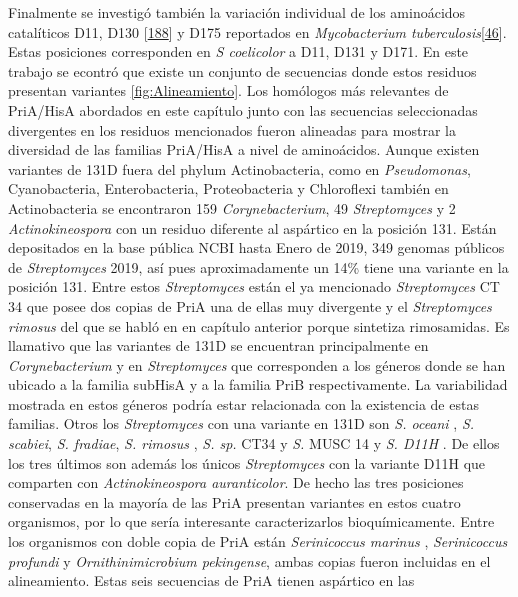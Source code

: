 \documentclass[12pt,twoside]{reedthesis}
\begin{document}
  Finalmente se investigó también la variación individual de los
  aminoácidos catalíticos D11, D130
  {[}\protect\hyperlink{ref-due_bisubstrate_2011}{188}{]} y D175
  reportados en \emph{Mycobacterium
  tuberculosis}{[}\protect\hyperlink{ref-verduzco-castro_co-occurrence_2016}{46}{]}.
  Estas posiciones corresponden en \emph{S coelicolor} a D11, D131 y D171.
  En este trabajo se econtró que existe un conjunto de secuencias donde
  estos residuos presentan variantes \autoref{fig:Alineamiento}. Los
  homólogos más relevantes de PriA/HisA abordados en este capítulo junto
  con las secuencias seleccionadas divergentes en los residuos mencionados
  fueron alineadas para mostrar la diversidad de las familias PriA/HisA a
  nivel de aminoácidos. Aunque existen variantes de 131D fuera del phylum
  Actinobacteria, como en \emph{Pseudomonas}, Cyanobacteria,
  Enterobacteria, Proteobacteria y Chloroflexi también en Actinobacteria
  se encontraron 159 \emph{Corynebacterium}, 49 \emph{Streptomyces} y 2
  \emph{Actinokineospora} con un residuo diferente al aspártico en la
  posición 131. Están depositados en la base pública NCBI hasta Enero de
  2019, 349 genomas públicos de \emph{Streptomyces} 2019, así pues
  aproximadamente un 14\% tiene una variante en la posición 131. Entre
  estos \emph{Streptomyces} están el ya mencionado \emph{Streptomyces } CT
  34 que posee dos copias de PriA una de ellas muy divergente y el
  \emph{Streptomyces rimosus} del que se habló en en capítulo anterior
  porque sintetiza rimosamidas. Es llamativo que las variantes de 131D se
  encuentran principalmente en \emph{Corynebacterium} y en
  \emph{Streptomyces} que corresponden a los géneros donde se han ubicado
  a la familia subHisA y a la familia PriB respectivamente. La
  variabilidad mostrada en estos géneros podría estar relacionada con la
  existencia de estas familias. Otros los \emph{Streptomyces} con una
  variante en 131D son \emph{S. oceani} , \emph{S. scabiei}, \emph{S.
  fradiae}, \emph{S. rimosus} , \emph{S. sp.} CT34 y \emph{S. } MUSC 14 y
  \emph{S. D11H} . De ellos los tres últimos son además los únicos
  \emph{Streptomyces} con la variante D11H que comparten con
  \emph{Actinokineospora auranticolor}. De hecho las tres posiciones
  conservadas en la mayoría de las PriA presentan variantes en estos
  cuatro organismos, por lo que sería interesante caracterizarlos
  bioquímicamente. Entre los organismos con doble copia de PriA están
  \emph{Serinicoccus marinus} , \emph{Serinicoccus profundi} y
  \emph{Ornithinimicrobium pekingense}, ambas copias fueron incluidas en
  el alineamiento. Estas seis secuencias de PriA tienen aspártico en las
\end{document}
